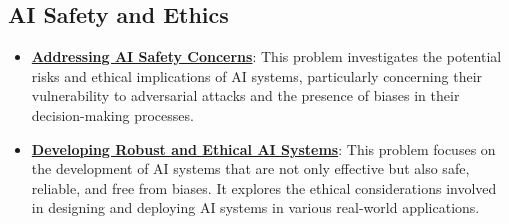 \documentclass{article}%
\begin{document}
\subsection{AI Safety and Ethics}%
\label{subsec:AISafetyandEthics}%
\begin{itemize}[leftmargin=*]%
\item \href{https://purdue.brightspace.com/d2l/common/assets/pdfjs-d2l-dist/1.0.14-legacy/web/viewer.html?file=\%2Fcontent\%2Fenforced\%2F1095467-wl.202510.CS.24300.001\%2F02L2-Intro.pdf\%3Fou\%3D1095467\&lang=en-us\&container=d2l-fileviewer-rendered-pdf\&fullscreen=d2l-fileviewer-rendered-pdf-dialog\&height=667#page=19}{\textbf{Addressing AI Safety Concerns}}: This problem investigates the potential risks and ethical implications of AI systems, particularly concerning their vulnerability to adversarial attacks and the presence of biases in their decision{-}making processes.%
\item \href{https://purdue.brightspace.com/d2l/common/assets/pdfjs-d2l-dist/1.0.14-legacy/web/viewer.html?file=\%2Fcontent\%2Fenforced\%2F1095467-wl.202510.CS.24300.001\%2F02L2-Intro.pdf\%3Fou\%3D1095467\&lang=en-us\&container=d2l-fileviewer-rendered-pdf\&fullscreen=d2l-fileviewer-rendered-pdf-dialog\&height=667#page=20}{\textbf{Developing Robust and Ethical AI Systems}}: This problem focuses on the development of AI systems that are not only effective but also safe, reliable, and free from biases. It explores the ethical considerations involved in designing and deploying AI systems in various real{-}world applications.%
\end{itemize}

%
\end{document}
